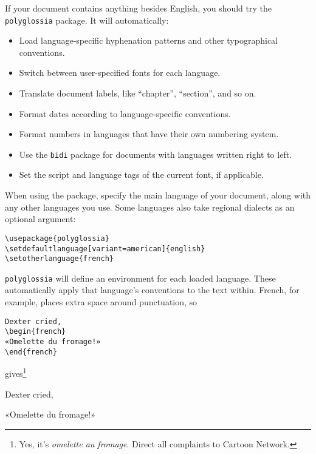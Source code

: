 If your document contains anything besides English,
you should try the \texttt{polyglossia} package.
It will automatically:
\begin{itemize}
\item Load language-specific hyphenation patterns and other typographical
    conventions.
\item Switch between user-specified fonts for each language.
\item Translate document labels,
    like ``chapter''\quotekern, ``section''\quotekern, and so on.
\item Format dates according to language-specific conventions.
\item Format numbers in languages that have their own numbering system.
\item Use the \texttt{bidi} package for documents with languages written
    right to left.
\item Set the script and language tags of the current font, if applicable.
\end{itemize}
When using the package, specify the main language of your document,
along with any other languages you use.
Some languages also take regional dialects as an optional argument:
\begin{leftfigure}
\begin{lstlisting}
\usepackage{polyglossia}
\setdefaultlanguage[variant=american]{english}
\setotherlanguage{french}
\end{lstlisting}
\end{leftfigure}
\texttt{polyglossia} will define an environment for each loaded language.
These automatically apply that language's conventions to the text within.
French, for example, places extra space around punctuation, so
\begin{leftfigure}
\begin{lstlisting}
Dexter cried,
\begin{french}
«Omelette du fromage!»
\end{french}
\end{lstlisting}
\end{leftfigure}
gives\footnote{Yes, it's \emph{omelette au fromage}.
Direct all complaints to Cartoon Network.}
\begin{leftfigure}
\lm%
Dexter cried,
\begin{french}
\lm%
«Omelette du fromage!»
\end{french}
\end{leftfigure}


